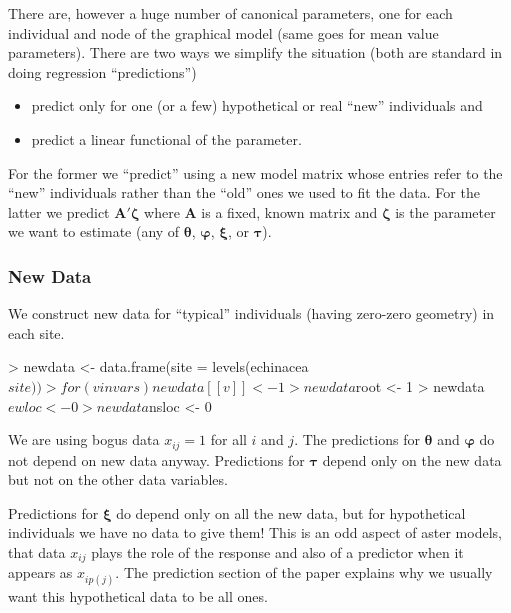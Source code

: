 \documentclass[11pt]{article}
\newcommand{\boldtheta}{{\boldsymbol{\theta}}}
\newcommand{\boldxi}{{\boldsymbol{\xi}}}
\newcommand{\boldtau}{{\boldsymbol{\tau}}}
\newcommand{\boldvarphi}{{\boldsymbol{\varphi}}}
\newcommand{\boldzeta}{{\boldsymbol{\zeta}}}
\newcommand{\boldA}{{\mathbf{A}}}
\begin{document}
There are, however a huge number of canonical parameters, one for each
individual and node of the graphical model (same goes for mean value
parameters).  There are two ways we simplify the situation (both are standard
in doing regression ``predictions'')
\begin{itemize}
\item predict only for one (or a few) hypothetical or real ``new'' individuals
and
\item predict a linear functional of the parameter.
\end{itemize}
For the former we ``predict'' using a new model matrix whose entries refer
to the ``new'' individuals rather than the ``old'' ones we used to fit the
data.  For the latter we predict $\boldA' \boldzeta$ where $\boldA$ is a
fixed, known matrix and $\boldzeta$ is the parameter we want to estimate
(any of $\boldtheta$, $\boldvarphi$, $\boldxi$, or $\boldtau$).

\subsubsection{New Data}

We construct new data for ``typical'' individuals
(having zero-zero geometry) in each site.
\begin{Schunk}
\begin{Sinput}
> newdata <- data.frame(site = levels(echinacea$site))
> for (v in vars) newdata[[v]] <- 1
> newdata$root <- 1
> newdata$ewloc <- 0
> newdata$nsloc <- 0
\end{Sinput}
\end{Schunk}

We are using bogus data $x_{i j} = 1$ for all $i$ and $j$.
The predictions for $\boldtheta$ and $\boldvarphi$ do not depend
on new data anyway.
Predictions for $\boldtau$ depend only on the new \verb@root@ data
but not on the other data variables.

Predictions for $\boldxi$ do depend only on all the new data, but
for hypothetical individuals we have no data to give them!  This
is an odd aspect of aster models, that data $x_{i j}$ plays the role of the
response and also of a predictor when it appears as $x_{i p(j)}$.
The prediction section of the paper explains why we usually want this
hypothetical data to be all ones.
\end{document}
